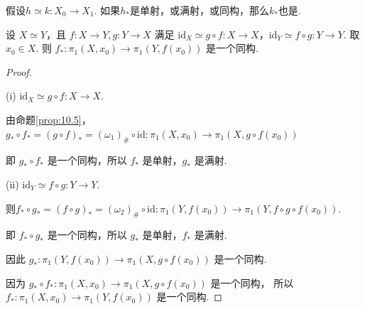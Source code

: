 \begin{corollary}[][cor:10.3]
    假设$h \simeq k: X_0 \to X_1$.
    如果$h_*$是单射，或满射，或同构，那么$k_*$也是.
\end{corollary}

\begin{theorem}[][thm:10.5]
    设 $X \simeq Y$，且 $f: X \to Y, g: Y \to X$ 满足 $\mathrm{id}_X \simeq g \circ f: X \to X$，$\mathrm{id}_Y \simeq f \circ g: Y \to Y$.
    取 $x_0 \in X$. 则 $f_*: \pi_1(X, x_0) \to \pi_1(Y, f(x_0))$ 是一个同构.
\end{theorem}

\begin{proof}
    \vspace{-2 em}
    \begin{center}
    \end{center}\par
    (i) $\mathrm{id}_X \simeq g \circ f: X \to X$.\par
    由命题\cref{prop:10.5}，$g_*\circ f_* = (g \circ f)_* = (\omega_1)_\# \circ \mathrm{id}: \pi_1(X, x_0) \to \pi_1(X, g \circ f(x_0)) $\par
    即 $g_* \circ f_*$ 是一个同构，所以 $f_*$ 是单射，$g_*$ 是满射.\par
    (ii) $\mathrm{id}_Y \simeq f \circ g: Y \to Y$.\par
    则$f_*\circ g_*=(f \circ g)_* = (\omega_2)_\# \circ \mathrm{id}: \pi_1(Y, f(x_0)) \to \pi_1(Y, f \circ g \circ f(x_0)) $.\par
    即 $f_* \circ g_*$ 是一个同构，所以 $g_*$ 是单射，$f_*$ 是满射.\par
    因此 $g_*: \pi_1(Y, f(x_0)) \to \pi_1(X, g \circ f(x_0))$ 是一个同构.\par
    因为 $g_* \circ f_*: \pi_1(X, x_0) \to \pi_1(X, g \circ f(x_0))$ 是一个同构，
    所以 $f_*: \pi_1(X, x_0) \to \pi_1(Y, f(x_0))$ 是一个同构.
\end{proof}

